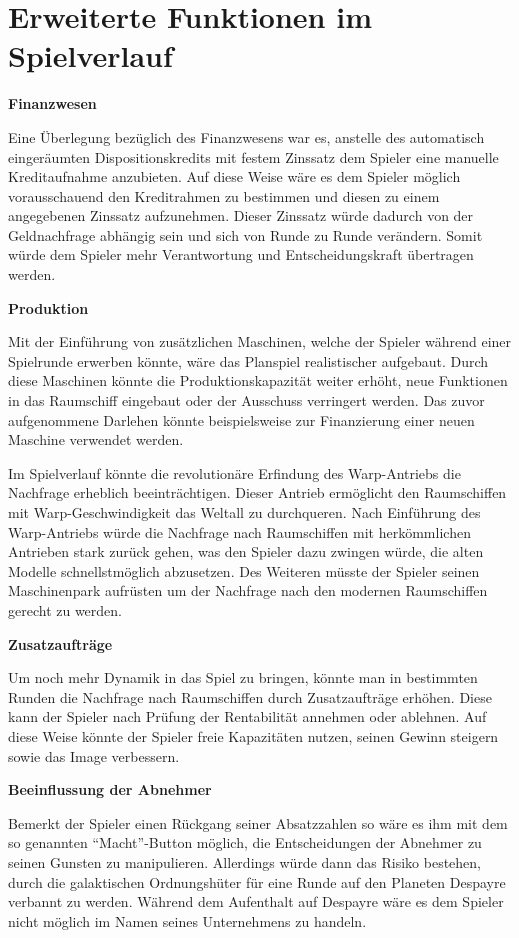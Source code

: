 \section{Erweiterte Funktionen im Spielverlauf}
\label{sec:fazit-spielverlauf}

\textbf{Finanzwesen}

Eine Überlegung bezüglich des Finanzwesens war es, anstelle des automatisch eingeräumten Dispositionskredits mit festem Zinssatz dem Spieler eine manuelle Kreditaufnahme anzubieten. Auf diese Weise wäre es dem Spieler möglich vorausschauend den Kreditrahmen zu bestimmen und diesen zu einem angegebenen Zinssatz aufzunehmen. Dieser Zinssatz würde dadurch von der Geldnachfrage abhängig sein und sich von Runde zu Runde verändern. Somit würde dem Spieler mehr Verantwortung und Entscheidungskraft übertragen werden. 

\textbf{Produktion}

Mit der Einführung von zusätzlichen Maschinen, welche der Spieler während einer Spielrunde erwerben könnte, wäre das Planspiel realistischer aufgebaut. Durch diese Maschinen könnte die Produktionskapazität weiter erhöht, neue Funktionen in das Raumschiff eingebaut oder der Ausschuss verringert werden. Das zuvor aufgenommene Darlehen könnte beispielsweise zur Finanzierung einer neuen Maschine verwendet werden. 

Im Spielverlauf könnte die revolutionäre Erfindung des Warp-Antriebs die Nachfrage erheblich beeinträchtigen. Dieser Antrieb ermöglicht den Raumschiffen mit Warp-Geschwindigkeit das Weltall zu durchqueren. Nach Einführung des Warp-Antriebs würde die Nachfrage nach Raumschiffen mit herkömmlichen Antrieben stark zurück gehen, was den Spieler dazu zwingen würde, die alten Modelle schnellstmöglich abzusetzen. Des Weiteren müsste der Spieler seinen Maschinenpark aufrüsten um der Nachfrage nach den modernen Raumschiffen gerecht zu werden.

\textbf{Zusatzaufträge}

Um noch mehr Dynamik in das Spiel zu bringen, könnte man in bestimmten Runden die Nachfrage nach Raumschiffen durch Zusatzaufträge erhöhen. Diese kann der Spieler nach Prüfung der Rentabilität annehmen oder ablehnen. Auf diese Weise könnte der Spieler freie Kapazitäten nutzen, seinen Gewinn steigern sowie das Image verbessern. 

\textbf{Beeinflussung der Abnehmer}

Bemerkt der Spieler einen Rückgang seiner Absatzzahlen so wäre es ihm mit dem so genannten “Macht”-Button möglich, die Entscheidungen der Abnehmer zu seinen Gunsten zu manipulieren. Allerdings würde dann das Risiko bestehen, durch die galaktischen Ordnungshüter für eine Runde auf den Planeten Despayre verbannt zu werden. Während dem Aufenthalt auf Despayre wäre es dem Spieler nicht möglich im Namen seines Unternehmens zu handeln. 

